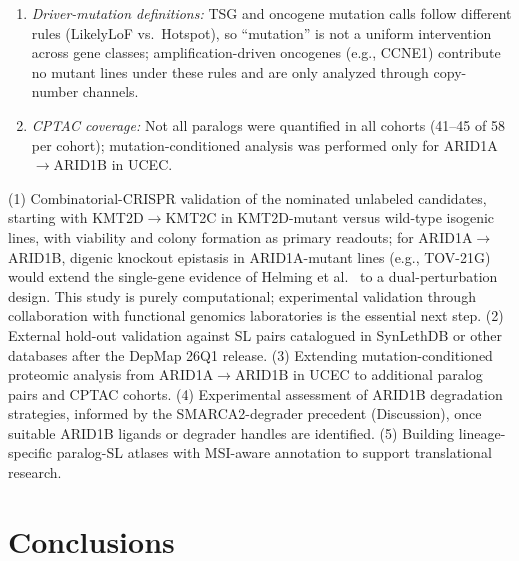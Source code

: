 \documentclass[11pt,a4paper]{article}
\begin{document}
\begin{enumerate}
\item \textit{Driver-mutation definitions:} TSG and oncogene mutation calls follow different rules (LikelyLoF vs.\ Hotspot), so ``mutation'' is not a uniform intervention across gene classes; amplification-driven oncogenes (e.g., CCNE1) contribute no mutant lines under these rules and are only analyzed through copy-number channels.
\item \textit{CPTAC coverage:} Not all paralogs were quantified in all cohorts (41--45 of 58 per cohort); mutation-conditioned analysis was performed only for ARID1A$\rightarrow$ARID1B in UCEC.
\end{enumerate}

(1) Combinatorial-CRISPR validation of the nominated unlabeled candidates, starting with KMT2D$\rightarrow$KMT2C in KMT2D-mutant versus wild-type isogenic lines, with viability and colony formation as primary readouts; for ARID1A$\rightarrow$ARID1B, digenic knockout epistasis in ARID1A-mutant lines (e.g., TOV-21G) would extend the single-gene evidence of Helming et al.\ \cite{Helming2014} to a dual-perturbation design. This study is purely computational; experimental validation through collaboration with functional genomics laboratories is the essential next step. (2) External hold-out validation against SL pairs catalogued in SynLethDB or other databases after the DepMap 26Q1 release. (3) Extending mutation-conditioned proteomic analysis from ARID1A$\rightarrow$ARID1B in UCEC to additional paralog pairs and CPTAC cohorts. (4) Experimental assessment of ARID1B degradation strategies, informed by the SMARCA2-degrader precedent (Discussion), once suitable ARID1B ligands or degrader handles are identified. (5) Building lineage-specific paralog-SL atlases with MSI-aware annotation to support translational research.


\section*{Conclusions}
\end{document}

